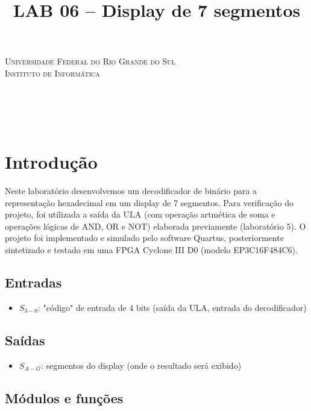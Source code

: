 \documentclass[12pt, fleqn]{article}
\title{LAB 06 – Display de 7 segmentos}
\renewcommand{\maketitle}{
    \begin{titlepage}
        \begin{center}
            {\scshape Universidade Federal do Rio Grande do Sul\\Instituto de Informática} \\
            \vspace*{\fill}
            {\large \thecourse} \\[16pt]
            {\Huge \thetitle} \\[36pt]
            \theauthors \\
            \vspace*{\fill}
            \theprofessor \\[2pt]
            \thesemester
        \end{center}
    \end{titlepage}
}
\begin{document}
\maketitle

\section{Introdução}

Neste laboratório desenvolvemos um decodificador de binário para a representação hexadecimal em um display de 7 segmentos. Para verificação do projeto, foi utilizada a saída da ULA (com operação artmética de soma e operações lógicas de AND, OR e NOT) elaborada previamente (laboratório 5). O projeto foi implementado e simulado pelo software Quartus, posteriormente sintetizado e testado em uma FPGA Cyclone III D0 (modelo EP3C16F484C6).

\subsection{Entradas}

\begin{itemize}
    \item $S_{3-0}$: "código" de entrada de 4 bits (saída da ULA, entrada do decodificador)
\end{itemize}

\subsection{Saídas}

\begin{itemize}
    \item $S_{A-G}$: segmentos do display (onde o resultado será exibido)
\end{itemize}

\subsection{Módulos e funções}
\end{document}
